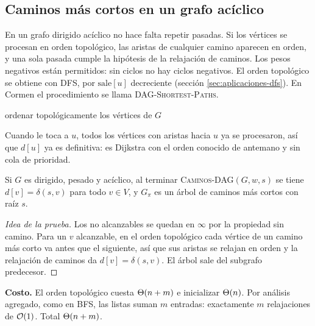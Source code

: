 \documentclass[11pt,letterpaper]{article}
\begin{document}
\subsection*{Caminos más cortos en un grafo acíclico}

En un grafo dirigido acíclico no hace falta repetir pasadas. Si los
vértices se procesan en orden topológico, las aristas de cualquier
camino aparecen en orden, y una sola pasada cumple la hipótesis de la
relajación de caminos. Los pesos negativos están permitidos: sin
ciclos no hay ciclos negativos. El orden topológico se obtiene con
DFS, por $\text{sale}[u]$ decreciente (sección
\ref{sec:aplicaciones-dfs}). En Cormen el procedimiento se llama
\textsc{DAG-Shortest-Paths}.

\begin{algorithm}[H]
\caption{\textsc{Caminos-DAG}$(G, w, s)$}
\label{alg:caminos-dag}
\begin{algorithmic}[1]
  \State ordenar topológicamente los vértices de $G$
  \State {}
      \State {}
    \EndFor
  \EndFor
\EndProcedure
\end{algorithmic}
\end{algorithm}

Cuando le toca a $u$, todos los vértices con aristas hacia $u$ ya se
procesaron, así que $d[u]$ ya es definitiva: es Dijkstra con el orden
conocido de antemano y sin cola de prioridad.

\begin{teorema}\label{teo:caminos-dag-correccion}
  Si $G$ es dirigido, pesado y acíclico, al terminar
  \textsc{Caminos-DAG}$(G, w, s)$ se tiene $d[v] = \delta(s, v)$ para
  todo $v \in V$, y $G_\pi$ es un árbol de caminos más cortos con raíz
  $s$.
\end{teorema}

\begin{proof}[Idea de la prueba]
  Los no alcanzables se quedan en $\infty$ por la propiedad sin
  camino. Para un $v$ alcanzable, en el orden topológico cada vértice
  de un camino más corto va antes que el siguiente, así que sus
  aristas se relajan en orden y la relajación de caminos da
  $d[v] = \delta(s, v)$. El árbol sale del subgrafo predecesor.
\end{proof}

\textbf{Costo.} El orden topológico cuesta $\Theta\!\left(n + m\right)$ e inicializar
$\Theta\!\left(n\right)$. Por análisis agregado, como en BFS, las listas suman $m$
entradas: exactamente $m$ relajaciones de $\mathcal{O}\!\left(1\right)$. Total
$\Theta\!\left(n + m\right)$.
\end{document}
